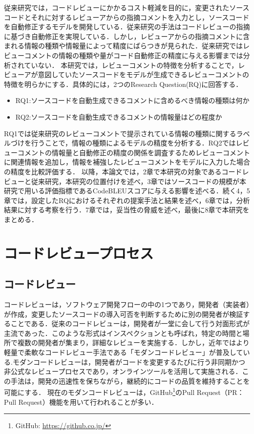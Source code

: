 \documentclass[11pt]{jreport}
\newcommand{\RQone}{ソースコードを自動生成できるコメントに含めるべき情報の種類は何か}
\newcommand{\RQtwo}{ソースコードを自動生成できるコメントの情報量はどの程度か}
\begin{document}
従来研究では，コードレビューにかかるコスト軽減を目的に，変更されたソースコードとそれに対するレビューアからの指摘コメントを入力とし，ソースコードを自動修正するモデルを開発している\cite{tufano2022using}．従来研究の手法はコードレビューの指摘に基づき自動修正を実現している．しかし，レビューアからの指摘コメントに含まれる情報の種類や情報量によって精度にばらつきが見られた．従来研究ではレビューコメントの情報の種類や量がコード自動修正の精度に与える影響までは分析されていない．
本研究では，レビューコメントの特徴を分析することで，レビューアが意図していたソースコードをモデルが生成できるレビューコメントの特徴を明らかにする．具体的には，2つのResearch Question(RQ)に回答する．
\begin{itemize}
\item RQ1:\RQone
\item RQ2:\RQtwo
\end{itemize}
RQ1では従来研究のレビューコメントで提示されている情報の種類に関するラベルづけを行うことで，情報の種類によるモデルの精度を分析する．RQ2ではレビューコメントの情報量と自動修正の精度の関係を調査するためレビューコメントに関連情報を追加し，情報を補強したレビューコメントをモデルに入力した場合の精度を比較評価する．
以降，本論文では，2章で本研究の対象であるコードレビューと従来研究，本研究の位置付けを述べ，3章ではソースコードの規模が本研究で用いる評価指標であるCodeBLEUスコアに与える影響を述べる．続く4，5章では，設定したRQにおけるそれぞれの提案手法と結果を述べ，6章では，分析結果に対する考察を行う．7章では，妥当性の脅威を述べ，最後に8章で本研究をまとめる．

\chapter{コードレビュープロセス}\label{chap:fig-tab-exp}
\section{コードレビュー}
コードレビューは，ソフトウェア開発フローの中の1つであり，開発者（実装者）が作成，変更したソースコードの導入可否を判断するために別の開発者が検証することである．従来のコードレビューは，開発者が一堂に会して行う対面形式が主流であった．このような形式はインスペクションとも呼ばれ，特定の時間と場所で複数の開発者が集まり，詳細なレビューを実施する．しかし，近年ではより軽量で柔軟なコードレビュー手法である「モダンコードレビュー」が普及している\cite{7081824}.モダンコードレビューは，開発者がコードを変更するたびに行う非同期かつ非公式なレビュープロセスであり，オンラインツールを活用して実施される．この手法は，開発の迅速性を保ちながら，継続的にコードの品質を維持することを可能にする．
現在のモダンコードレビューは，GitHub\footnote{GitHub: \url{https://github.co.jp/}}のPull Request（PR： Pull Request）機能を用いて行われることが多い．
\end{document}
